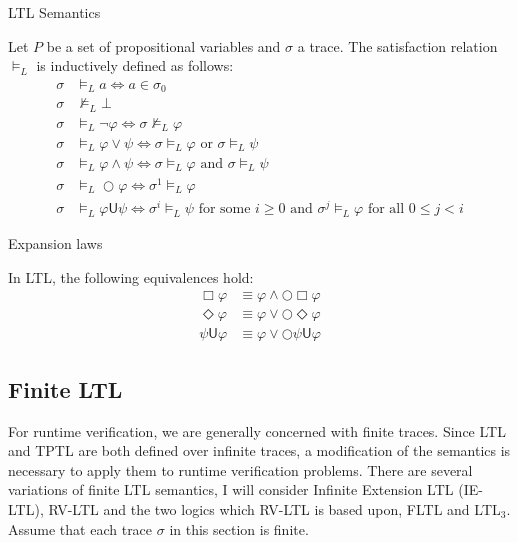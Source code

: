 \documentclass[a4paper]{article}
\newcommand{\U}{\mathsf{U}}
\newcommand{\tand}{\text{ and }}
\newcommand{\tor}{\text{ or }}
\newcommand{\fsome}{\text{ for some }}
\newcommand{\fall}{\text{ for all }}
\begin{document}
\begin{defn}{LTL Semantics}

  Let $P$ be a set of propositional variables and $\sigma$ a trace. The satisfaction relation $\vDash_{L}$ is inductively defined as follows:
\begin{align*}
  \sigma &\vDash_{L} a \iff a \in \sigma_0\\
  \sigma &\nvDash_{L} \bot\\
  \sigma &\vDash_{L} \neg \varphi \iff \sigma \nvDash_{L} \varphi\\
  \sigma &\vDash_{L} \varphi \lor \psi \iff \sigma \vDash_{L} \varphi \tor \sigma \vDash_{L} \psi\\
  \sigma &\vDash_{L} \varphi \land \psi \iff \sigma \vDash_{L} \varphi \tand \sigma \vDash_{L} \psi\\
  \sigma &\vDash_{L} \bigcirc \varphi \iff \sigma^1 \vDash_{L} \varphi\\
  \sigma &\vDash_{L} \varphi \U \psi \iff \sigma^i \vDash_{L} \psi \fsome i \geq 0 \tand \sigma^j \vDash_{L} \varphi \fall 0 \leq j < i
\end{align*}

\end{defn}

\begin{lem}{Expansion laws}

  In LTL, the following equivalences hold:
  \begin{align}
    \Box \varphi &\equiv \varphi \land \bigcirc \Box \varphi\\
    \Diamond \varphi &\equiv \varphi \lor \bigcirc \Diamond \varphi\\
    \psi \U \varphi &\equiv \varphi \lor \bigcirc \psi \U \varphi
  \end{align}

\end{lem}



\subsection{Finite LTL}
For runtime verification, we are generally concerned with finite traces. Since LTL and TPTL are both defined over infinite traces, a modification of the semantics is necessary to apply them to runtime verification problems. %
There are several variations of finite LTL semantics, I will consider Infinite Extension LTL (IE-LTL)\autocite{rosu2005rewriting}, RV-LTL\autocite{bauer2010comparing} and the two logics which RV-LTL is based upon, FLTL and LTL$_3$\autocite{bauer2010comparing}.
Assume that each trace $\sigma$ in this section is finite.
\end{document}
